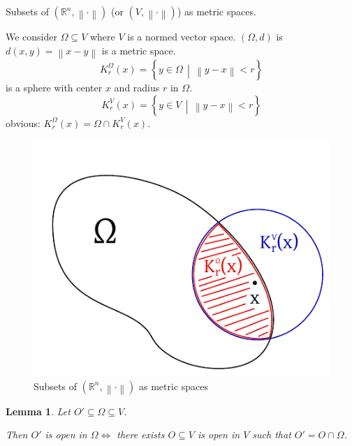 \documentclass{article}
\newtheorem{lemma}{Lemma}  \numberwithin{lemma}{section}
\newcommand{\setdef}[2]{\left\{\left.#1\,\middle|\,#2\right.\right\}}
\newcommand{\norm}[1]{\left\|#1\right\|}
\begin{document}
Subsets of $(\mathbb R^n, \norm{\cdot})$ (or $(V, \norm{\cdot})$) as metric spaces.

We consider $\Omega \subseteq V$ where $V$ is a normed vector space.
$(\Omega, d)$ is $d(x, y) = \norm{x - y}$ is a metric space.
\[ K_r^\Omega(x) = \setdef{y \in \Omega}{\norm{y - x} < r} \]
is a sphere with center $x$ and radius $r$ in $\Omega$.
\[ K_r^V(x) = \setdef{y \in V}{\norm{y - x} < r} \]
obvious: $K_r^\Omega(x) = \Omega \cap K_r^V(x)$.

\begin{figure}[t]
  \begin{center}
    \includegraphics{img/08.pdf}
    \caption{Subsets of $(\mathbb R^n, \norm{\cdot})$ as metric spaces}
    \label{img:subs}
  \end{center}
\end{figure}

\begin{lemma} %
  Let $O' \subseteq \Omega \subseteq V$.

  Then $O'$ is open in $\Omega \iff$ there exists $O \subseteq V$ is open in $V$ such that $O' = O \cap \Omega$.
\end{lemma}
\end{document}
